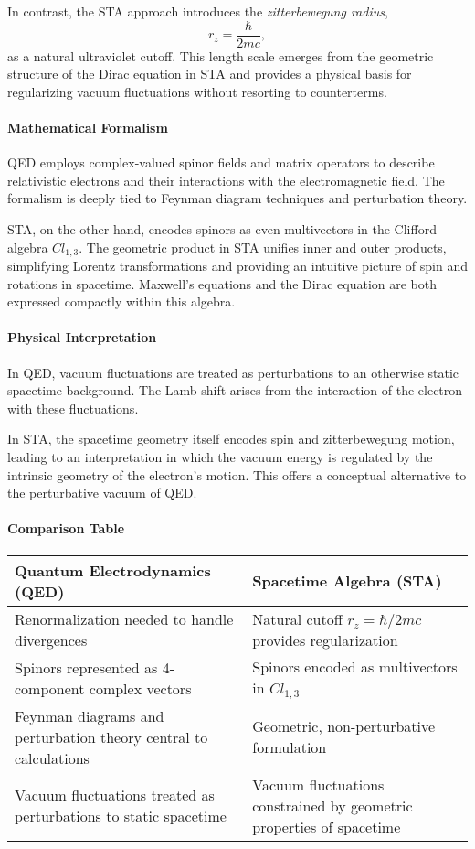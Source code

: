 \documentclass[12pt]{article}
\begin{document}
In contrast, the STA approach introduces the \emph{zitterbewegung radius},
\[
r_z = \frac{\hbar}{2mc},
\]
as a natural ultraviolet cutoff. This length scale emerges from the geometric structure of the Dirac equation in STA and provides a physical basis for regularizing vacuum fluctuations without resorting to counterterms.

\paragraph{Mathematical Formalism}
QED employs complex-valued spinor fields and matrix operators to describe relativistic electrons and their interactions with the electromagnetic field. The formalism is deeply tied to Feynman diagram techniques and perturbation theory.

STA, on the other hand, encodes spinors as even multivectors in the Clifford algebra \(Cl_{1,3}\). The geometric product in STA unifies inner and outer products, simplifying Lorentz transformations and providing an intuitive picture of spin and rotations in spacetime. Maxwell’s equations and the Dirac equation are both expressed compactly within this algebra.

\paragraph{Physical Interpretation}
In QED, vacuum fluctuations are treated as perturbations to an otherwise static spacetime background. The Lamb shift arises from the interaction of the electron with these fluctuations.

In STA, the spacetime geometry itself encodes spin and zitterbewegung motion, leading to an interpretation in which the vacuum energy is regulated by the intrinsic geometry of the electron’s motion. This offers a conceptual alternative to the perturbative vacuum of QED.

\paragraph{Comparison Table}

\begin{center}
\begin{tabular}{|p{5cm}|p{5cm}|}
\hline
\textbf{Quantum Electrodynamics (QED)} & \textbf{Spacetime Algebra (STA)} \\
\hline
Renormalization needed to handle divergences & Natural cutoff \(r_z = \hbar/2mc\) provides regularization \\
\hline
Spinors represented as 4-component complex vectors & Spinors encoded as multivectors in \(Cl_{1,3}\) \\
\hline
Feynman diagrams and perturbation theory central to calculations & Geometric, non-perturbative formulation \\
\hline
Vacuum fluctuations treated as perturbations to static spacetime & Vacuum fluctuations constrained by geometric properties of spacetime \\
\hline
\end{tabular}
\end{center}
\end{document}
